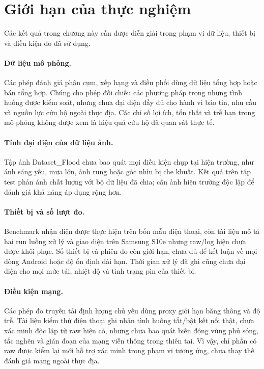 \section{Giới hạn của thực nghiệm}\label{sec:04-evaluation-limitations}
Các kết quả trong chương này cần được diễn giải trong phạm vi dữ liệu, thiết bị và điều kiện đo đã sử dụng.

\paragraph{Dữ liệu mô phỏng.}
Các phép đánh giá phân cụm, xếp hạng và điều phối dùng dữ liệu tổng hợp hoặc bán tổng hợp. Chúng cho phép đối chiếu các phương pháp trong những tình huống được kiểm soát, nhưng chưa đại diện đầy đủ cho hành vi báo tin, nhu cầu và nguồn lực cứu hộ ngoài thực địa. Các chỉ số lợi ích, tổn thất và trễ hạn trong mô phỏng không được xem là hiệu quả cứu hộ đã quan sát thực tế.

\paragraph{Tính đại diện của dữ liệu ảnh.}
Tập ảnh Dataset\_Flood chưa bao quát mọi điều kiện chụp tại hiện trường, như ánh sáng yếu, mưa lớn, ảnh rung hoặc góc nhìn bị che khuất. Kết quả trên tập test phản ánh chất lượng với bộ dữ liệu đã chia; cần ảnh hiện trường độc lập để đánh giá khả năng áp dụng rộng hơn.

\paragraph{Thiết bị và số lượt đo.}
Benchmark nhận diện được thực hiện trên bốn mẫu điện thoại, còn tài liệu mô tả hai run luồng xử lý và giao diện trên Samsung S10e nhưng raw/log hiện chưa được khôi phục. Số thiết bị và phiên đo còn giới hạn, chưa đủ để kết luận về mọi dòng Android hoặc độ ổn định dài hạn. Thời gian xử lý đã ghi cũng chưa đại diện cho mọi mức tải, nhiệt độ và tình trạng pin của thiết bị.

\paragraph{Điều kiện mạng.}
Các phép đo truyền tải định lượng chủ yếu dùng proxy giới hạn băng thông và độ trễ. Tài liệu kiểm thử điện thoại ghi nhận tình huống tắt/bật kết nối thật, chưa xác minh độc lập từ raw hiện có, nhưng chưa bao quát biến động vùng phủ sóng, tắc nghẽn và gián đoạn của mạng viễn thông trong thiên tai. Vì vậy, chỉ phần có raw được kiểm lại mới hỗ trợ xác minh trong phạm vi tương ứng, chưa thay thế đánh giá mạng ngoài thực địa.

